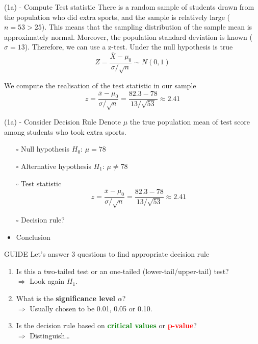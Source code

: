 \documentclass[
  11pt,
  ignorenonframetext,
]{beamer}
\providecommand{\tightlist}{%
  \setlength{\itemsep}{0pt}\setlength{\parskip}{0pt}}
\begin{document}
\begin{frame}{(1a) - Compute Test statistic}
\protect\hypertarget{a---compute-test-statistic-1}{}
There is a random sample of students drawn from the population who did
extra sports, and the sample is relatively large (\(n = 53 > 25\)). This
means that the sampling distribution of the sample mean is approximately
normal. Moreover, the population standard deviation is known
(\(\sigma=13\)). Therefore, we can use a z-test. Under the null
hypothesis is true \[
Z =\frac{\bar{X}-\mu_0}{\sigma/\sqrt{n}} \sim N(0,1)
\]

We compute the realisation of the test statistic in our sample \[
z = \frac{\bar{x}-\mu_0}{\sigma/\sqrt{n}} = \frac{82.3-78}{13/\sqrt{53}} \approx 2.41
\]
\end{frame}

\begin{frame}{(1a) - Consider Decision Rule}
\protect\hypertarget{a---consider-decision-rule}{}
Denote \(\mu\) the true population mean of test score among students who
took extra sports.

\begin{itemize}
    \item [$\square$] Null hypothesis $H_0$: $\mu = 78$\\
    \vspace{2mm}
    \item [$\square$] Alternative hypothesis $H_1$: $\mu \neq 78$\\
    \vspace{2mm}
    \item [$\square$] Test statistic
$$
z = \frac{\bar{x}-\mu_0}{\sigma/\sqrt{n}} = \frac{82.3-78}{13/\sqrt{53}} \approx 2.41
$$
    \item [$\square$] Decision rule?
    \item Conclusion
\end{itemize}
\end{frame}

\begin{frame}{GUIDE \faMapO}
\protect\hypertarget{guide-1}{}
Let's answer 3 questions to find appropriate decision rule

\vspace{2mm}

\begin{enumerate}
\tightlist
\item
  Is this a two-tailed test or an one-tailed (lower-tail/upper-tail)
  test?\\
  \(\Longrightarrow\) Look again \(H_1\).
\item
  What is the \textbf{significance level} \(\alpha\)?\\
  \(\Longrightarrow\) Usually chosen to be 0.01, 0.05 or 0.10.
\item
  Is the decision rule based on
  \textcolor{green}{\textbf{critical values}} or
  \textcolor{red}{\textbf{p-value}}?\\
  \(\Longrightarrow\) Distinguish\ldots{}
\end{enumerate}
\end{frame}
\end{document}
